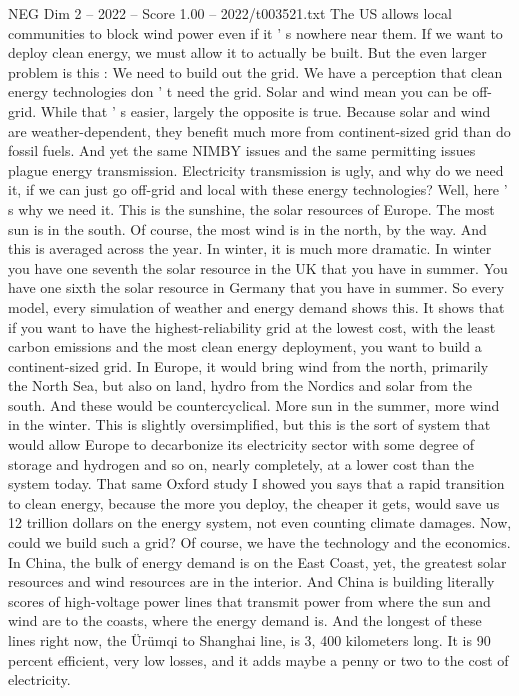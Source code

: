 \begin{textsample}{NEG Dim 2 – 2022 – Score 1.00 – 2022/t003521.txt}
The US allows local communities to block wind power even if it ' s nowhere near them.
If we want to deploy clean energy, we must allow it to actually be built.
But the even larger problem is this : We need to build out the grid.
We have a perception that clean energy technologies don ' t need the grid.
Solar and wind mean you can be off-grid.
While that ' s easier, largely the opposite is true.
Because solar and wind are weather-dependent, they benefit much more from continent-sized grid than do fossil fuels.
And yet the same NIMBY issues and the same permitting issues plague energy transmission.
Electricity transmission is ugly, and why do we need it, if we can just go off-grid and local with these energy technologies?
Well, here ' s why we need it.
This is the sunshine, the solar resources of Europe.
The most sun is in the south.
Of course, the most wind is in the north, by the way.
And this is averaged across the year.
In winter, it is much more dramatic.
In winter you have one seventh the solar resource in the UK that you have in summer.
You have one sixth the solar resource in Germany that you have in summer.
So every model, every simulation of weather and energy demand shows this.
It shows that if you want to have the highest-reliability grid at the lowest cost, with the least carbon emissions and the most clean energy deployment, you want to build a continent-sized grid.
In Europe, it would bring wind from the north, primarily the North Sea, but also on land, hydro from the Nordics and solar from the south.
And these would be countercyclical.
More sun in the summer, more wind in the winter.
This is slightly oversimplified, but this is the sort of system that would allow Europe to decarbonize its electricity sector with some degree of storage and hydrogen and so on, nearly completely, at a lower cost than the system today.
That same Oxford study I showed you says that a rapid transition to clean energy, because the more you deploy, the cheaper it gets, would save us 12 trillion dollars on the energy system, not even counting climate damages.
Now, could we build such a grid?
Of course, we have the technology and the economics.
In China, the bulk of energy demand is on the East Coast, yet, the greatest solar resources and wind resources are in the interior.
And China is building literally scores of high-voltage power lines that transmit power from where the sun and wind are to the coasts, where the energy demand is.
And the longest of these lines right now, the Ürümqi to Shanghai line, is 3, 400 kilometers long.
It is 90 percent efficient, very low losses, and it adds maybe a penny or two to the cost of electricity.

\end{textsample}

